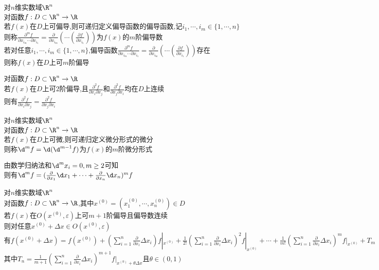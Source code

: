 \begin{dingyi}
对$n$维实数域$\R^n$\\
对函数$f:D\subset \R^n \to \R$\\
若$f(x)$在$D$上可偏导,则可递归定义偏导函数的偏导函数,记$i_1,\cdots,i_m\in\{1,\cdots,n\}$\\
则称$\frac{\partial^m f}{\partial x_{i_m}\cdots\partial x_{i_1}}=\frac{\partial}{\partial x_{i_m}}(\cdots(\frac{\partial f}{\partial x_{i_1}}))$为$f(x)$的$m$阶偏导数\\
若对任意$i_1,\cdots,i_m\in\{1,\cdots,n\}$,偏导函数$\frac{\partial^m f}{\partial x_{i_m}\cdots\partial x_{i_1}}=\frac{\partial}{\partial x_{i_m}}(\cdots(\frac{\partial f}{\partial x_{i_1}}))$存在\\
则称$f(x)$在$D$上可$m$阶偏导
\end{dingyi}

\begin{dingli}
对函数$f:D\subset \R^n \to \R$\\
若$f(x)$在$D$上可$2$阶偏导,且$\frac{\partial^2 f}{\partial x_i\partial x_j}$和$\frac{\partial^2 f}{\partial x_j\partial x_i}$均在$D$上连续\\
则有$\frac{\partial^2 f}{\partial x_i\partial x_j}=\frac{\partial^2 f}{\partial x_j\partial x_i}$
\end{dingli}

\begin{dingyi}
对$n$维实数域$\R^n$\\
对函数$f:D\subset \R^n \to \R$\\
若$f(x)$在$D$上可微,则可递归定义微分形式的微分\\
则称$\d^m f=\d(\d^{m-1}f)$为$f(x)$的$m$阶微分形式
\end{dingyi}

\begin{zhu}
由数学归纳法和$\d^{m} x_i=0,m\geq 2$可知\\
则有$\d^m f=(\frac{\partial }{\partial x_1}\d x_1+\cdots+\frac{\partial }{\partial x_n}\d x_n)^{m}f$
\end{zhu}

\begin{dingli}
对$n$维实数域$\R^n$\\
对函数$f:D\subset \R^n \to \R$,其中$x^{(0)}=(x_1^{(0)},\cdots,x_n^{(0)})\in D$\\
若$f(x)$在$O(x^{(0)},\varepsilon)$上可$m+1$阶偏导且偏导数连续\\
则对任意$x^{(0)}+\Delta x\in O(x^{(0)},\varepsilon)$\\
有$f(x^{(0)}+\Delta x)=f(x^{(0)})+(\sum\limits_{i=1}^{n}\frac{\partial }{\partial x_i}\Delta x_i)f|_{x^{(0)}}+\frac{1}{2!}(\sum\limits_{i=1}^{n}\frac{\partial }{\partial x_i}\Delta x_i)^2f|_{x^{(0)}}+\cdots+\frac{1}{m!}(\sum\limits_{i=1}^{n}\frac{\partial }{\partial x_i}\Delta x_i)^mf|_{x^{(0)}}+T_m$\\
其中$T_n=\frac{1}{m+1}(\sum\limits_{i=1}^{n}\frac{\partial }{\partial x_i}\Delta x_i)^{m+1}f|_{x^{(0)}+\theta\Delta x}$且$\theta\in(0,1)$
\end{dingli}

